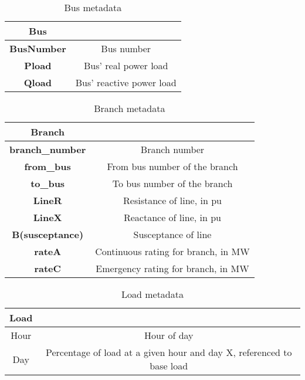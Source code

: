 \documentclass[11pt]{exam}
\begin{document}
\vspace{-0.5cm}
\begin{table}[!htbp]
\centering
\caption{Bus metadata}
\begin{tabular}{@{}cc@{}}
\toprule
\textbf{Bus}       &                          \\ \bottomrule
\textbf{BusNumber} & Bus number               \\
\textbf{Pload}     & Bus' real power load     \\
\textbf{Qload}     & Bus' reactive power load \\ \bottomrule
\end{tabular}
\end{table}
\vspace{-0.5cm}
\begin{table}[!htbp]
\centering
\caption{Branch metadata}
\begin{tabular}{@{}cc@{}}
\toprule
\textbf{Branch}         &                                     \\ \bottomrule
\textbf{branch\_number} & Branch number                       \\
\textbf{from\_bus}      & From bus number of the branch       \\
\textbf{to\_bus}        & To  bus number of the branch        \\
\textbf{LineR}          & Resistance of line, in pu           \\
\textbf{LineX}          & Reactance of line, in pu            \\
\textbf{B(susceptance)} & Susceptance of line                 \\
\textbf{rateA}          & Continuous rating for branch, in MW \\
\textbf{rateC}          & Emergency rating for branch, in MW \\ \bottomrule
\end{tabular}
\end{table}
\vspace{-0.5cm}
\begin{table}[!htbp]
\centering
\caption{Load metadata}
\begin{tabular}{@{}cc@{}}
\toprule
\textbf{Load} &                                                                         \\ \bottomrule
Hour          & Hour of day                                                             \\
Day           & Percentage of load at a given hour and day X, referenced to   base load \\ \bottomrule
\end{tabular}
\end{table}
\newpage
\end{document}
